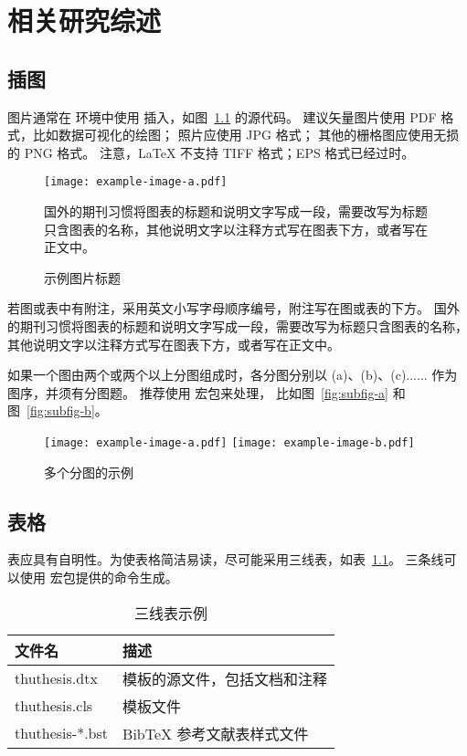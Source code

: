 
\chapter{相关研究综述}

\section{插图}

图片通常在  环境中使用  插入，如图~\ref{fig:example} 的源代码。
建议矢量图片使用 PDF 格式，比如数据可视化的绘图；
照片应使用 JPG 格式；
其他的栅格图应使用无损的 PNG 格式。
注意，LaTeX 不支持 TIFF 格式；EPS 格式已经过时。

\begin{figure}
  \centering
  \texttt{[image: example-image-a.pdf]}
  \caption*{国外的期刊习惯将图表的标题和说明文字写成一段，需要改写为标题只含图表的名称，其他说明文字以注释方式写在图表下方，或者写在正文中。}
  \caption{示例图片标题}
  \label{fig:example}
\end{figure}

若图或表中有附注，采用英文小写字母顺序编号，附注写在图或表的下方。
国外的期刊习惯将图表的标题和说明文字写成一段，需要改写为标题只含图表的名称，其他说明文字以注释方式写在图表下方，或者写在正文中。

如果一个图由两个或两个以上分图组成时，各分图分别以 (a)、(b)、(c)...... 作为图序，并须有分图题。
推荐使用  宏包来处理， 比如图~\ref{fig:subfig-a} 和图~\ref{fig:subfig-b}。

\begin{figure}
  \centering
    {\texttt{[image: example-image-a.pdf]}}
    {\texttt{[image: example-image-b.pdf]}}
  \caption{多个分图的示例}
  \label{fig:multi-image}
\end{figure}



\section{表格}

表应具有自明性。为使表格简洁易读，尽可能采用三线表，如表~\ref{tab:three-line}。
三条线可以使用  宏包提供的命令生成。

\begin{table}
  \centering
  \caption{三线表示例}
  \begin{tabular}{ll}
    \toprule
    文件名          & 描述                         \\
    \midrule
    thuthesis.dtx   & 模板的源文件，包括文档和注释 \\
    thuthesis.cls   & 模板文件                     \\
    thuthesis-*.bst & BibTeX 参考文献表样式文件    \\
    \bottomrule
  \end{tabular}
  \label{tab:three-line}
\end{table}

